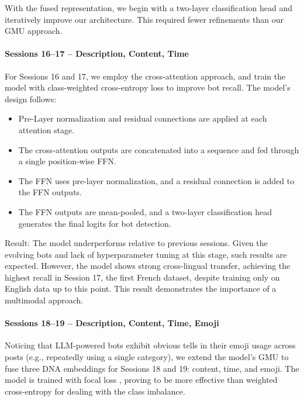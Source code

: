 \documentclass[conference]{IEEEtran}
\begin{document}
With the fused representation, we begin with a 
two-layer classification head and iteratively improve our architecture.
This required fewer refinements than our GMU approach.

\paragraph{\textbf{Sessions 16–17} – Description, Content, Time}
For Sessions 16 and 17, we employ the cross-attention approach, and
train the model with class-weighted cross-entropy loss to 
improve bot recall.
The model's design follows:
\begin{itemize}
    \item Pre-Layer normalization \citep{xiong2020layer} and residual connections
        are applied at each attention stage.

    \item The cross‑attention outputs are concatenated into a 
    sequence and fed through a single position‑wise FFN.

    \item The FFN uses pre-layer normalization, and 
    a residual connection is added to the FFN outputs.

    \item The FFN outputs are mean-pooled, and 
    a two-layer classification head generates the final logits for bot detection.
\end{itemize}

Result: The model underperforms relative to previous sessions.
Given the evolving bots and lack of hyperparameter tuning at 
this stage, such results are expected. 
However, the model shows strong cross-lingual transfer,
achieving the highest recall in Session 17, the first French dataset,
despite training only on English data up to this point. This result 
demonstrates the importance of a multimodal approach.

\paragraph{\textbf{Sessions 18–19} – Description, Content, Time, Emoji}
Noticing that LLM-powered bots exhibit obvious tells in their emoji usage across posts 
(e.g., repeatedly using a single category), we extend
the model's GMU to fuse three DNA embeddings for Sessions 18 and 19: content, time, and emoji.
The model is trained with focal loss \citep{lin2017focal}, proving
to be more effective than weighted cross-entropy for dealing with the class imbalance.
\end{document}
